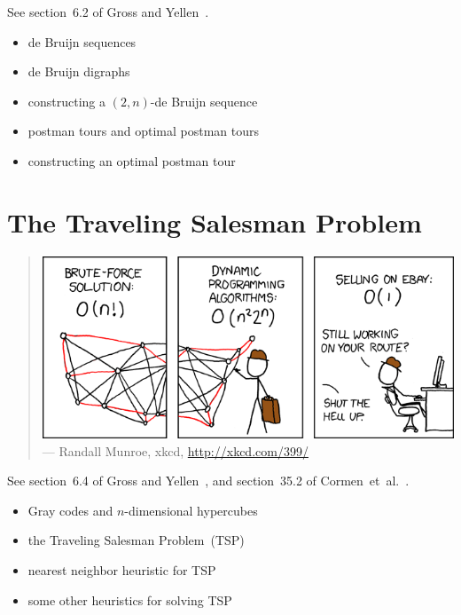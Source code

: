 See section~6.2 of Gross and Yellen~\cite{GrossYellen1999}.

\begin{itemize}
\item de Bruijn sequences

\item de Bruijn digraphs

\item constructing a $(2, n)$-de Bruijn sequence

\item postman tours and optimal postman tours

\item constructing an optimal postman tour
\end{itemize}



\section{The Traveling Salesman Problem}

\begin{quote}
\includegraphics[scale=0.5]{image/optimal-traversals/travelling-salesman-problem} \\
\noindent
--- Randall Munroe, xkcd,
\url{http://xkcd.com/399/}
\end{quote}

\noindent
See section~6.4 of Gross and Yellen~\cite{GrossYellen1999}, and
section~35.2 of Cormen~et~al.~\cite{CormenEtAl2001}.

\begin{itemize}
\item Gray codes and $n$-dimensional hypercubes

\item the Traveling Salesman Problem~(TSP)

\item nearest neighbor heuristic for TSP

\item some other heuristics for solving TSP
\end{itemize}
